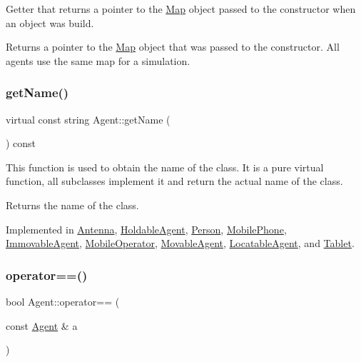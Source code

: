 Getter that returns a pointer to the \mbox{\hyperlink{class_map}{Map}} object passed to the constructor when an object was build. \begin{DoxyReturn}{Returns}
a pointer to the \mbox{\hyperlink{class_map}{Map}} object that was passed to the constructor. All agents use the same map for a simulation. 
\end{DoxyReturn}
\mbox{\label{class_agent_afe6c72d91baf9ee4fe77ea1ed7fef3ba}} 
\subsubsection{\texorpdfstring{getName()}{getName()}}
{\footnotesize\ttfamily virtual const string Agent\+::get\+Name (\begin{DoxyParamCaption}{ }\end{DoxyParamCaption}) const\hspace{0.3cm}{\ttfamily [pure virtual]}}

This function is used to obtain the name of the class. It is a pure virtual function, all subclasses implement it and return the actual name of the class. \begin{DoxyReturn}{Returns}
the name of the class. 
\end{DoxyReturn}


Implemented in \mbox{\hyperlink{class_antenna_a4ad9da1ca9d79f20b331c22b94c57a02}{Antenna}}, \mbox{\hyperlink{class_holdable_agent_ab330bb40de51a957ef8826af629f94a2}{Holdable\+Agent}}, \mbox{\hyperlink{class_person_aa2a6f8d7f1d94045a03ca578f2ed272c}{Person}}, \mbox{\hyperlink{class_mobile_phone_a1eeac3141baafa75ebcf26fc3a0e4068}{Mobile\+Phone}}, \mbox{\hyperlink{class_immovable_agent_ae8fbccc744f6f806e47dfd242fa67a1c}{Immovable\+Agent}}, \mbox{\hyperlink{class_mobile_operator_a2b4538d96f7aa898e6e470411d40cbf7}{Mobile\+Operator}}, \mbox{\hyperlink{class_movable_agent_abcc1218876c39c996f2cb1eba2b96379}{Movable\+Agent}}, \mbox{\hyperlink{class_locatable_agent_a754105958bb672744b525538f1584a7b}{Locatable\+Agent}}, and \mbox{\hyperlink{class_tablet_adc7196aaee1e9714236b7cd8825d5826}{Tablet}}.

\mbox{\label{class_agent_afa2b3a408bb0694aea46fb2bb59bacf7}} 
\subsubsection{\texorpdfstring{operator==()}{operator==()}}
{\footnotesize\ttfamily bool Agent\+::operator== (\begin{DoxyParamCaption}\item[{const \mbox{\hyperlink{class_agent}{Agent}} \&}]{a }\end{DoxyParamCaption})}

